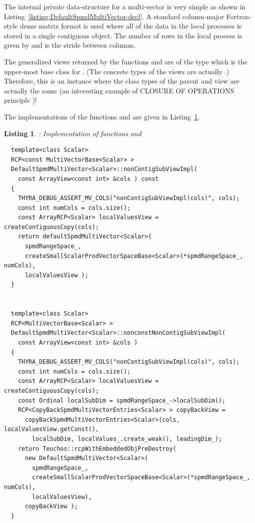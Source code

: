 \documentclass[pdf,ps2pdf,11pt]{SANDreport}
\newtheorem{listing}{Listing}
\begin{document}
The internal private data-structure for a multi-vector is very simple
as shown in Listing~\ref{listing:DefaultSpmdMultiVector-decl}.  A
standard column-major Fortran-style dense matrix format is used where
all of the data in the local processes is stored in a single
contiguous {} object.  The number of rows in the
local process is given by {} and
{} is the stride between columns.

The generalized views returned by the functions
{} and
{} are of the type
{} which is the upper-most base class for
{}.  (The concrete types of the views are
actually {}.) Therefore, this is an
instance where the class types of the parent and view are actually the
same (an interesting example of CLOSURE OF OPERATIONS principle
{}\cite[Chapter 10]{DomainDrivenDesign})!

The implementations of the functions {} 
and {} are given in
Listing~\ref{listing:DefaultSpmdMultiVector-subivew-impl}.


{}\begin{listing}: Implementation of {}
functions {} and
{} \\
\label{listing:DefaultSpmdMultiVector-subivew-impl}
{\small\begin{verbatim}
  template<class Scalar>
  RCP<const MultiVectorBase<Scalar> >
  DefaultSpmdMultiVector<Scalar>::nonContigSubViewImpl(
    const ArrayView<const int> &cols ) const
  {
    THYRA_DEBUG_ASSERT_MV_COLS("nonContigSubViewImpl(cols)", cols);
    const int numCols = cols.size();
    const ArrayRCP<Scalar> localValuesView = createContiguousCopy(cols);
    return defaultSpmdMultiVector<Scalar>(
      spmdRangeSpace_,
      createSmallScalarProdVectorSpaceBase<Scalar>(*spmdRangeSpace_, numCols),
      localValuesView );
  }
  

  template<class Scalar>
  RCP<MultiVectorBase<Scalar> >
  DefaultSpmdMultiVector<Scalar>::nonconstNonContigSubViewImpl(
    const ArrayView<const int> &cols )
  {
    THYRA_DEBUG_ASSERT_MV_COLS("nonContigSubViewImpl(cols)", cols);
    const int numCols = cols.size();
    const ArrayRCP<Scalar> localValuesView = createContiguousCopy(cols);
    const Ordinal localSubDim = spmdRangeSpace_->localSubDim();
    RCP<CopyBackSpmdMultiVectorEntries<Scalar> > copyBackView =
      copyBackSpmdMultiVectorEntries<Scalar>(cols, localValuesView.getConst(),
        localSubDim, localValues_.create_weak(), leadingDim_);
    return Teuchos::rcpWithEmbeddedObjPreDestroy(
      new DefaultSpmdMultiVector<Scalar>(
        spmdRangeSpace_,
        createSmallScalarProdVectorSpaceBase<Scalar>(*spmdRangeSpace_, numCols),
        localValuesView),
      copyBackView );
  }
\end{verbatim}}
\end{listing}
\end{document}
